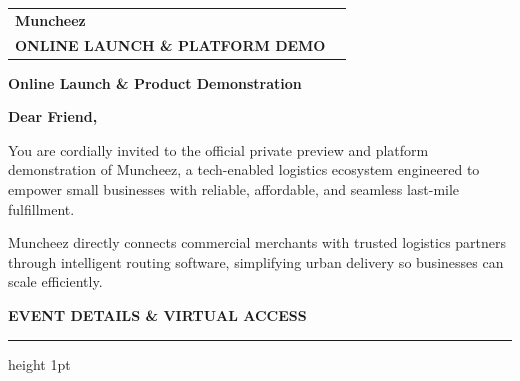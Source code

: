 \documentclass[11pt,a4paper]{article}
\begin{document}
\begin{tabularx}{\textwidth}{@{} X >{\raggedleft\arraybackslash}X @{}}
    {\fontsize{38}{44}\sffamily\bfseries\color{CorporateNavy} Muncheez\color{LinkBlue}{\textbf{.}}} & 
    \begin{raggedleft}
        {\fontsize{11}{14}\sffamily\bfseries\color{CorporateNavy} PRIVATE PREVIEW INVITATION} \\[0.05cm]
        {\fontsize{9}{12}\sffamily\bfseries\color{LinkBlue}\uppercase{Online Launch \& Platform Demo}}
    \end{raggedleft} \\
\end{tabularx}

\vspace{0.4cm}


\vspace{0.8cm}

{\fontsize{24}{30}\sffamily\bfseries\color{CorporateNavy} Online Launch \& Product Demonstration}

\vspace{0.4cm}
\textsf{\small\bfseries\color{CorporateNavy} Dear Friend,}

\vspace{0.3cm}
\textsf{\small\color{DeepCharcoal} You are cordially invited to the official private preview and platform demonstration of Muncheez, a tech-enabled logistics ecosystem engineered to empower small businesses with reliable, affordable, and seamless last-mile fulfillment.}

\vspace{0.25cm}
\textsf{\small\color{DeepCharcoal} Muncheez directly connects commercial merchants with trusted logistics partners through intelligent routing software, simplifying urban delivery so businesses can scale efficiently.}

\vspace{0.8cm}

{\fontsize{13}{16}\sffamily\bfseries\color{CorporateNavy} EVENT DETAILS \& VIRTUAL ACCESS}

\vspace{0.2cm}
\color{RuleNavy}\hrule height 1pt
\vspace{0.6cm}
\end{document}
